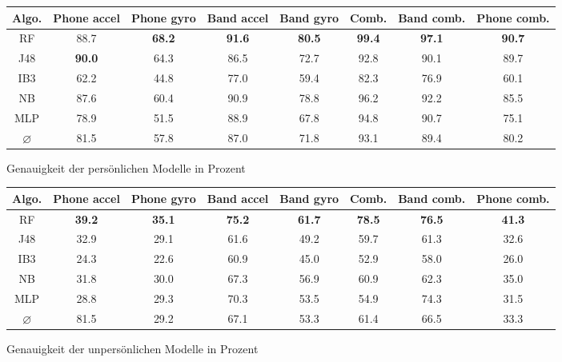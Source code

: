 
\begin{figure}
\centering
\begin{tabular}{|c|c|c|c|c|c|c|c|}
	\hline 
	\textbf{Algo.} & \textbf{Phone accel} & \textbf{Phone gyro} & \textbf{Band accel} & \textbf{Band gyro} & \textbf{Comb.} & \textbf{Band comb.} & \textbf{Phone comb.} \\ 
	\hline 
	RF & 88.7 & \textbf{68.2} & \textbf{91.6} & \textbf{80.5} & \textbf{99.4} & \textbf{97.1} & \textbf{90.7} \\ 
	J48 & \textbf{90.0} & 64.3 & 86.5 & 72.7 & 92.8 & 90.1 & 89.7 \\ 
	IB3 & 62.2 & 44.8 & 77.0 & 59.4 & 82.3 & 76.9 & 60.1 \\ 
	NB & 87.6 & 60.4 & 90.9 & 78.8 & 96.2 & 92.2 & 85.5 \\ 
	MLP & 78.9 & 51.5 & 88.9 & 67.8 & 94.8 & 90.7 & 75.1 \\ 
	\hline 
	$\varnothing$ & 81.5 & 57.8 & 87.0 & 71.8 & 93.1 & 89.4 & 80.2 \\ 
	\hline 
\end{tabular}
\caption{Genauigkeit der persönlichen Modelle in Prozent}
\label{fig:accuracy-personal}
\end{figure}

\begin{figure}
\centering
\begin{tabular}{|c|c|c|c|c|c|c|c|}
	\hline 
	\textbf{Algo.} & \textbf{Phone accel} & \textbf{Phone gyro} & \textbf{Band accel} & \textbf{Band gyro} & \textbf{Comb.} & \textbf{Band comb.} & \textbf{Phone comb.} \\ 
	\hline 
	RF & \textbf{39.2} & \textbf{35.1} & \textbf{75.2} & \textbf{61.7} & \textbf{78.5} & \textbf{76.5} & \textbf{41.3} \\ 
	J48 & 32.9 & 29.1 & 61.6 & 49.2 & 59.7 & 61.3 & 32.6 \\ 
	IB3 & 24.3 & 22.6 & 60.9 & 45.0 & 52.9 & 58.0 & 26.0 \\ 
	NB & 31.8 & 30.0 & 67.3 & 56.9 & 60.9 & 62.3 & 35.0 \\ 
	MLP & 28.8 & 29.3 & 70.3 & 53.5 & 54.9 & 74.3 & 31.5 \\ 
	\hline 
	$\varnothing$ & 81.5 & 29.2 & 67.1 & 53.3 & 61.4 & 66.5 & 33.3 \\ 
	\hline 
\end{tabular} 
\caption{Genauigkeit der unpersönlichen Modelle in Prozent}
\label{fig:accuracy-impersonal}
\end{figure}

